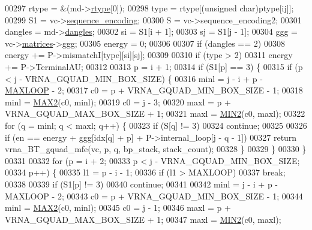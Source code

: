 \begin{DoxyCode}
00297   rtype   = &(md->\hyperlink{group__model__details_ad082d0fea31e002b90cdfe5e6382f8b0}{rtype}[0]);
00298   type    = rtype[(\textcolor{keywordtype}{unsigned} char)ptype[ij]];
00299   S1      = vc->\hyperlink{group__fold__compound_a9934bdb695d35a3544285cbcc19f9763}{sequence\_encoding};
00300   S       = vc->sequence\_encoding2;
00301   dangles = md->\hyperlink{group__model__details_adcda4ff2ea77748ae0e8700288282efc}{dangles};
00302   si      = S1[i + 1];
00303   sj      = S1[j - 1];
00304   ggg     = vc->\hyperlink{group__fold__compound_aca8be7bdc65bafe2172c6ee777f18568}{matrices}->\hyperlink{group__dp__matrices_a0b7b86a5c75c96eabb89eb53a13e7164}{ggg};
00305   energy  = 0;
00306 
00307   \textcolor{keywordflow}{if} (dangles == 2)
00308     energy += P->mismatchI[type][si][sj];
00309 
00310   \textcolor{keywordflow}{if} (type > 2)
00311     energy += P->TerminalAU;
00312 
00313   p = i + 1;
00314   \textcolor{keywordflow}{if} (S1[p] == 3) \{
00315     \textcolor{keywordflow}{if} (p < j - VRNA\_GQUAD\_MIN\_BOX\_SIZE) \{
00316       minl  = j - i + p - \hyperlink{energy__const_8h_ad1bd6eabac419670ddd3c9ed82145988}{MAXLOOP} - 2;
00317       c0    = p + VRNA\_GQUAD\_MIN\_BOX\_SIZE - 1;
00318       minl  = \hyperlink{group__utils_ga33297b3679c713b0c4d897cd0fe3b122}{MAX2}(c0, minl);
00319       c0    = j - 3;
00320       maxl  = p + VRNA\_GQUAD\_MAX\_BOX\_SIZE + 1;
00321       maxl  = \hyperlink{group__utils_gae0b9cd0ce090bd69b951aa73e8fa4f7d}{MIN2}(c0, maxl);
00322       \textcolor{keywordflow}{for} (q = minl; q < maxl; q++) \{
00323         \textcolor{keywordflow}{if} (S[q] != 3)
00324           \textcolor{keywordflow}{continue};
00325 
00326         \textcolor{keywordflow}{if} (en == energy + ggg[idx[q] + p] + P->internal\_loop[j - q - 1])
00327           \textcolor{keywordflow}{return} vrna\_BT\_gquad\_mfe(vc, p, q, bp\_stack, stack\_count);
00328       \}
00329     \}
00330   \}
00331 
00332   \textcolor{keywordflow}{for} (p = i + 2;
00333        p < j - VRNA\_GQUAD\_MIN\_BOX\_SIZE;
00334        p++) \{
00335     l1 = p - i - 1;
00336     \textcolor{keywordflow}{if} (l1 > MAXLOOP)
00337       \textcolor{keywordflow}{break};
00338 
00339     \textcolor{keywordflow}{if} (S1[p] != 3)
00340       \textcolor{keywordflow}{continue};
00341 
00342     minl  = j - i + p - MAXLOOP - 2;
00343     c0    = p + VRNA\_GQUAD\_MIN\_BOX\_SIZE - 1;
00344     minl  = \hyperlink{group__utils_ga33297b3679c713b0c4d897cd0fe3b122}{MAX2}(c0, minl);
00345     c0    = j - 1;
00346     maxl  = p + VRNA\_GQUAD\_MAX\_BOX\_SIZE + 1;
00347     maxl  = \hyperlink{group__utils_gae0b9cd0ce090bd69b951aa73e8fa4f7d}{MIN2}(c0, maxl);

\end{DoxyCode}
